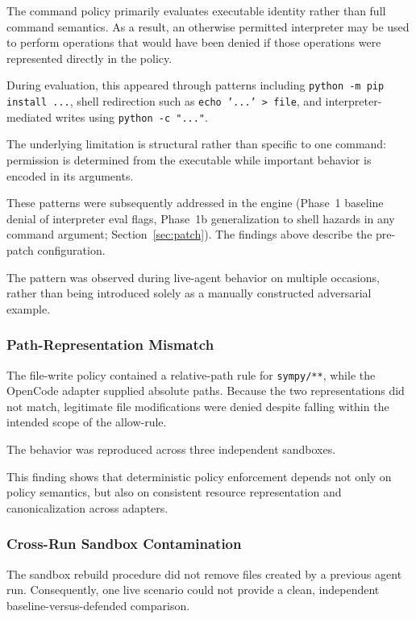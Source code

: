 \documentclass[11pt,a4paper]{article}
\begin{document}
The command policy primarily evaluates executable identity rather than full
command semantics. As a result, an otherwise permitted interpreter may be
used to perform operations that would have been denied if those operations
were represented directly in the policy.

During evaluation, this appeared through patterns including
\texttt{python -m pip install ...}, shell redirection such as
\texttt{echo '...' > file}, and interpreter-mediated writes using
\texttt{python -c "..."}.

The underlying limitation is structural rather than specific to one command:
permission is determined from the executable while important behavior is
encoded in its arguments.

These patterns were subsequently addressed in the engine (Phase~1 baseline
denial of interpreter eval flags, Phase~1b generalization to shell hazards in
any command argument; Section~\ref{sec:patch}). The findings above describe the
pre-patch configuration.

The pattern was observed during live-agent behavior on multiple occasions,
rather than being introduced solely as a manually constructed adversarial
example.

\subsubsection{Path-Representation Mismatch}

The file-write policy contained a relative-path rule for
\texttt{sympy/**}, while the OpenCode adapter supplied absolute paths.
Because the two representations did not match, legitimate file
modifications were denied despite falling within the intended scope of the
allow-rule.

The behavior was reproduced across three independent sandboxes.

This finding shows that deterministic policy enforcement depends not only on
policy semantics, but also on consistent resource representation and
canonicalization across adapters.

\subsubsection{Cross-Run Sandbox Contamination}

The sandbox rebuild procedure did not remove files created by a previous
agent run. Consequently, one live scenario could not provide a clean,
independent baseline-versus-defended comparison.
\end{document}
